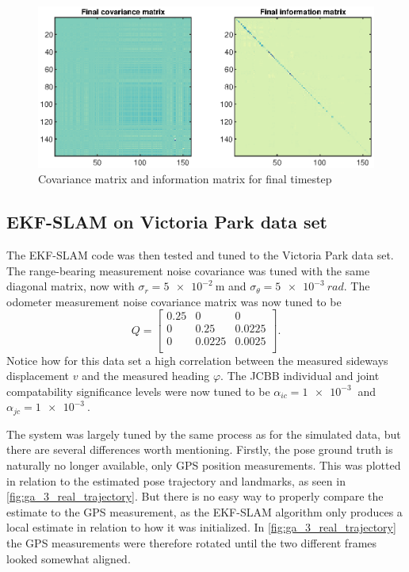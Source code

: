 \begin{figure}[!htb]
    \centering
    \includegraphics[width=0.8\linewidth]{figures/ga_3/sim_P.eps}
    \caption{Covariance matrix and information matrix for final timestep}
    \label{fig:ga_3_sim_P}
\end{figure}


\subsection{EKF-SLAM on Victoria Park data set}

The EKF-SLAM code was then tested and tuned to the Victoria Park data set. The range-bearing measurement noise covariance was tuned with the same diagonal matrix, now with $\sigma_r = \SI{5e-2}{\meter}$ and $\sigma_\theta = \SI{5e-3}{rad}$. The odometer measurement noise covariance matrix was now tuned to be
\begin{equation}
    Q = \begin{bmatrix}
        0.25 & 0 & 0 \\
        0 & 0.25 & 0.0225 \\
        0 & 0.0225 & 0.0025 \\
    \end{bmatrix}.
\end{equation}
Notice how for this data set a high correlation between the measured sideways displacement $v$ and the measured heading $\varphi$. The JCBB individual and joint compatability significance levels were now tuned to be $\alpha_{ic} = \SI{1e-3}{}$ and $\alpha_{jc} = \SI{1e-3}{}$.

The system was largely tuned by the same process as for the simulated data, but there are several differences worth mentioning. Firstly, the pose ground truth is naturally no longer available, only GPS position measurements. This was plotted in relation to the estimated pose trajectory and landmarks, as seen in \cref{fig:ga_3_real_trajectory}. But there is no easy way to properly compare the estimate to the GPS measurement, as the EKF-SLAM algorithm only produces a local estimate in relation to how it was initialized. In \cref{fig:ga_3_real_trajectory} the GPS measurements were therefore rotated until the two different frames looked somewhat aligned.

